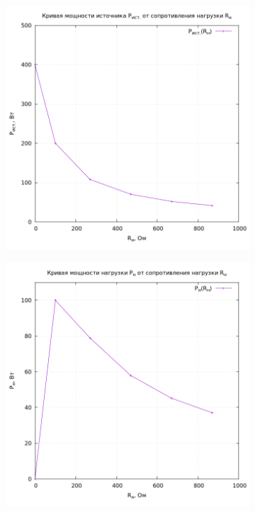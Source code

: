 \documentclass[12pt, a4paper]{report}
\begin{document}
\begin{enumerate}
\begin{figure}[H]
\begin{subfigure}{0.5\linewidth}
					\includegraphics[width=\linewidth]{P_ist_R.png}
				\end{subfigure}
				\medskip
				\begin{subfigure}{0.5\linewidth}
					\includegraphics[width=\linewidth]{P_n_R.png}

\end{subfigure}
\end{figure}
\end{enumerate}
\end{document}
